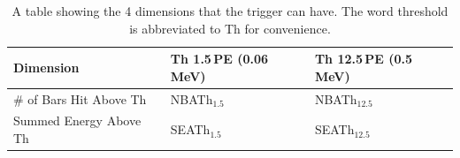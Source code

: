\begin{table}[!h]
\centering
\begin{tabular}{lll}  
\toprule
Dimension               & Th 1.5\,PE (0.06\,MeV) & Th 12.5\,PE (0.5\,MeV)\\
\midrule
\# of Bars Hit Above Th &  NBATh$_{1.5}$         & NBATh$_{12.5}$\\
Summed Energy Above Th  &  SEATh$_{1.5}$         & SEATh$_{12.5}$\\
\bottomrule  
\end{tabular}
\caption{A table showing the 4 dimensions that the trigger can have. The word threshold is abbreviated to Th for convenience.}
\label{tab:triggerDims}
\end{table}


